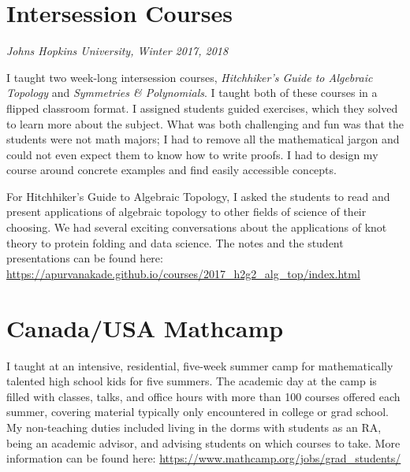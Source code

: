 \documentclass[
]{report}
\begin{document}
\hypertarget{intersession-courses}{%
\section{Intersession Courses}\label{intersession-courses}}

\emph{Johns Hopkins University, Winter 2017, 2018}

I taught two week-long intersession courses, \emph{Hitchhiker's Guide to Algebraic Topology} and \emph{Symmetries \& Polynomials}. I taught both of these courses in a flipped classroom format. I assigned students guided exercises, which they solved to learn more about the subject. What was both challenging and fun was that the students were not math majors; I had to remove all the mathematical jargon and could not even expect them to know how to write proofs. I had to design my course around concrete examples and find easily accessible concepts.

For Hitchhiker's Guide to Algebraic Topology, I asked the students to read and present applications of algebraic topology to other fields of science of their choosing. We had several exciting conversations about the applications of knot theory to protein folding and data science. The notes and the student presentations can be found here: \url{https://apurvanakade.github.io/courses/2017_h2g2_alg_top/index.html}

\hypertarget{canadausa-mathcamp}{%
\section{Canada/USA Mathcamp}\label{canadausa-mathcamp}}

I taught at an intensive, residential, five-week summer camp for mathematically talented high school
kids for five summers. The academic day at the camp is filled with classes, talks, and office hours with
more than 100 courses offered each summer, covering material typically only encountered in college or
grad school. My non-teaching duties included living in the dorms with students as an RA, being an
academic advisor, and advising students on which courses to take. More information can be found here:
\url{https://www.mathcamp.org/jobs/grad_students/}
\end{document}
